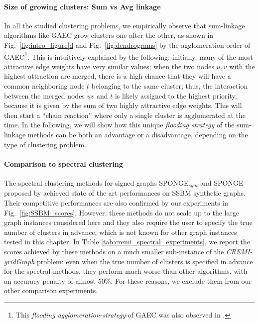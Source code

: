 \paragraph{Size of growing clusters: Sum vs Avg linkage} 
In all the studied clustering problems, we empirically observe that sum-linkage algorithms like GAEC grow clusters one after the other, as shown in Fig.~\hyperref[fig:intro_figure]{\ref*{fig:intro_figure}d} and Fig.~\ref{fig:dendrograms} by the agglomeration order of GAEC\footnote{This \emph{flooding agglomeration-strategy} of GAEC was also observed in \cite{kardoostsolving}.}. This is intuitively explained by the  following: initially, many of the most attractive edge weights have very similar values; when the two nodes $u,v$ with the highest attraction are merged, there is a high chance that they will have a common neighboring node $t$ belonging to the same cluster; thus, the interaction between the merged nodes $uv$ and $t$ is likely assigned to the highest priority, because it is given by the sum of two highly attractive edge weights. This will then start a ``chain reaction'' where only a single cluster is agglomerated at the time. 
In the following, we will show how this unique \emph{flooding strategy} of the sum-linkage methods can be both an advantage or a disadvantage, depending on the type of clustering problem. 

\paragraph{Comparison to spectral clustering} 
The spectral clustering methods for signed graphs SPONGE$_{sym}$ and SPONGE proposed by \cite{Cucuringu2019SPONGEAG} achieved state of the art performances on SSBM synthetic graphs. Their competitive performances are also confirmed by our experiments in Fig.~\ref{fig:SSBM_scores}.
However, these methods do not scale up to the large graph instances considered here and they also require the user to specify the true number of clusters in advance, which is not known for other graph instances tested in this chapter. In Table \ref{tab:cremi_spectral_experiments}, we report the scores achieved by these methods on a much smaller sub-instance of the \emph{CREMI-gridGraph} problem: even when the true number of clusters is specified in advance for the spectral methods, they perform much worse than other \algname{} algorithms, with an accuracy penalty of almost 50\%. For these reasons, we exclude them from our other comparison experiments.  








